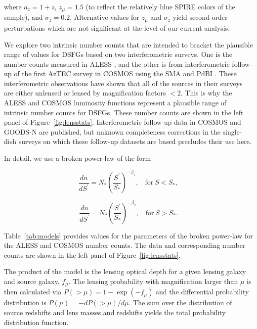 \documentclass[iop]{emulateapj}
\begin{document}
\noindent where $a_z = 1 + z$, $z_\mu = 1.5$ (to reflect the relatively blue
SPIRE colors of the sample), and $\sigma_z = 0.2$.  Alternative
values for $z_\mu$ and $\sigma_z$ yield second-order perturbations which are
not significant at the level of our current analysis.

We explore two intrinsic number counts that are intended to bracket the
plausible range of values for DSFGs based on two interferometric surveys.  One
is the number counts measured in ALESS \citep{Karim:2013lr}, and the
other is from interferometric follow-up of the first AzTEC survey in COSMOS
\citep{Scott:2008qy} using the SMA \citep{Younger:2007fk, Younger:2009lr} and
PdBI \citep{Miettinen:2015lr}.  These interferometric observations have shown
that all of the sources in their surveys are either unlensed or lensed by
magnification factors $<2$.  This is why the ALESS and COSMOS luminosity
functions represent a plausible range of intrinsic number counts for
DSFGs.  These number counts are shown in the left panel of
Figure~\ref{fig:lensstats}.  Interferometric follow-up data in COSMOS
\citep{Smolcic:2012zl} and GOODS-N \citep{Barger:2012yg} are published, but
unknown completeness corrections in the single-dish surveys on which these
follow-up datasets are based precludes their use here.

In detail, we use a broken power-law of the form

\begin{equation}
\frac{dn}{dS^\prime} = N_\ast\left(\frac{S^\prime}{S_\ast}\right)^{-\beta_1},~~~~\textrm{for}~S<S_\ast,
\end{equation} 

\begin{displaymath}
\frac{dn}{dS^\prime} = N_\ast\left(\frac{S^\prime}{S_\ast}\right)^{-\beta_2},~~~~\textrm{for}~S>S_\ast.
\end{displaymath}

Table~\ref{tab:models} provides values for the parameters of the broken
power-law for the ALESS and COSMOS number counts.  The data and
corresponding number counts are shown in the left panel of
Figure~\ref{fig:lensstats}.



The product of the model is the lensing optical depth for a given lensing
galaxy and source galaxy,  $f_\mu$. The lensing probability with magnification
larger than $\mu$ is then calculated via $P(>\mu) = 1-\exp(-f_\mu)$ and the
differential probability distribution is $P(\mu) = -dP(>\mu)/d\mu$.  The sum
over the distribution of source redshifts and lens masses and redshifts yields
the total probability distribution function.
\end{document}
